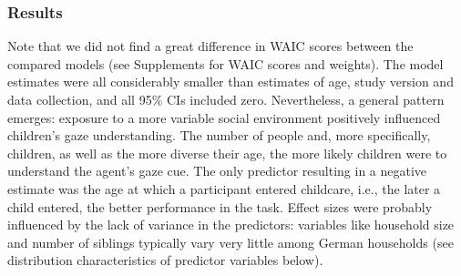 \documentclass[
  man,floatsintext]{apa6}
\begin{document}
\hypertarget{results}{%
\subsubsection{Results}\label{results}}

\begin{table}[H]
\centering
{}
\end{table}

Note that we did not find a great difference in WAIC scores between the compared models (see Supplements for WAIC scores and weights). The model estimates were all considerably smaller than estimates of age, study version and data collection, and all 95\% CIs included zero. Nevertheless, a general pattern emerges: exposure to a more variable social environment positively influenced children's gaze understanding. The number of people and, more specifically, children, as well as the more diverse their age, the more likely children were to understand the agent's gaze cue. The only predictor resulting in a negative estimate was the age at which a participant entered childcare, i.e., the later a child entered, the better performance in the task. Effect sizes were probably influenced by the lack of variance in the predictors: variables like household size and number of siblings typically vary very little among German households (see distribution characteristics of predictor variables below).
\end{document}
